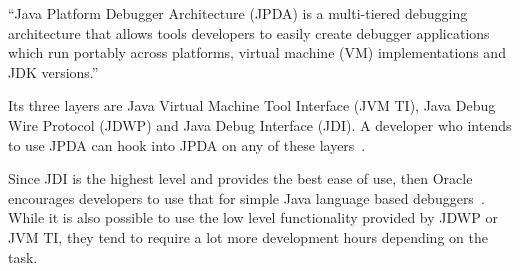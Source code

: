 \documentclass[..thesis.tex]{subfiles}
\begin{document}
\enquote{Java Platform Debugger Architecture (JPDA) is a multi-tiered debugging architecture that allows tools developers to easily create debugger applications which run portably across platforms, virtual machine (VM) implementations and JDK versions.}~\cite{oracle_jpda_spec}

Its three layers are Java Virtual Machine Tool Interface (JVM TI), Java Debug Wire Protocol (JDWP) and Java Debug Interface (JDI). 
A developer who intends to use JPDA can hook into JPDA on any of these layers~\cite{oracle_jpda_spec}. 



Since JDI is the highest level and provides the best ease of use, then Oracle encourages developers to use that for simple Java language based debuggers~\cite{oracle_jpda_spec}.
While it is also possible to use the low level functionality provided by JDWP or JVM TI, they tend to require a lot more development hours depending on the task. 
\end{document}
